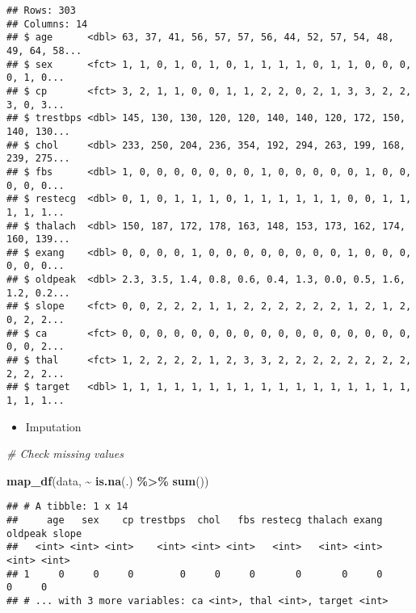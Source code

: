 \documentclass[
]{book}
\newenvironment{Shaded}{\begin{snugshade}}{\end{snugshade}}
\newcommand{\CommentTok}[1]{\textcolor[rgb]{0.56,0.35,0.01}{\textit{#1}}}
\newcommand{\KeywordTok}[1]{\textcolor[rgb]{0.13,0.29,0.53}{\textbf{#1}}}
\newcommand{\NormalTok}[1]{#1}
\newcommand{\OperatorTok}[1]{\textcolor[rgb]{0.81,0.36,0.00}{\textbf{#1}}}
\newcommand{\StringTok}[1]{\textcolor[rgb]{0.31,0.60,0.02}{#1}}
\providecommand{\tightlist}{%
  \setlength{\itemsep}{0pt}\setlength{\parskip}{0pt}}
\begin{document}
\begin{verbatim}
## Rows: 303
## Columns: 14
## $ age      <dbl> 63, 37, 41, 56, 57, 57, 56, 44, 52, 57, 54, 48, 49, 64, 58...
## $ sex      <fct> 1, 1, 0, 1, 0, 1, 0, 1, 1, 1, 1, 0, 1, 1, 0, 0, 0, 0, 1, 0...
## $ cp       <fct> 3, 2, 1, 1, 0, 0, 1, 1, 2, 2, 0, 2, 1, 3, 3, 2, 2, 3, 0, 3...
## $ trestbps <dbl> 145, 130, 130, 120, 120, 140, 140, 120, 172, 150, 140, 130...
## $ chol     <dbl> 233, 250, 204, 236, 354, 192, 294, 263, 199, 168, 239, 275...
## $ fbs      <dbl> 1, 0, 0, 0, 0, 0, 0, 0, 1, 0, 0, 0, 0, 0, 1, 0, 0, 0, 0, 0...
## $ restecg  <dbl> 0, 1, 0, 1, 1, 1, 0, 1, 1, 1, 1, 1, 1, 0, 0, 1, 1, 1, 1, 1...
## $ thalach  <dbl> 150, 187, 172, 178, 163, 148, 153, 173, 162, 174, 160, 139...
## $ exang    <dbl> 0, 0, 0, 0, 1, 0, 0, 0, 0, 0, 0, 0, 0, 1, 0, 0, 0, 0, 0, 0...
## $ oldpeak  <dbl> 2.3, 3.5, 1.4, 0.8, 0.6, 0.4, 1.3, 0.0, 0.5, 1.6, 1.2, 0.2...
## $ slope    <fct> 0, 0, 2, 2, 2, 1, 1, 2, 2, 2, 2, 2, 2, 1, 2, 1, 2, 0, 2, 2...
## $ ca       <fct> 0, 0, 0, 0, 0, 0, 0, 0, 0, 0, 0, 0, 0, 0, 0, 0, 0, 0, 0, 2...
## $ thal     <fct> 1, 2, 2, 2, 2, 1, 2, 3, 3, 2, 2, 2, 2, 2, 2, 2, 2, 2, 2, 2...
## $ target   <dbl> 1, 1, 1, 1, 1, 1, 1, 1, 1, 1, 1, 1, 1, 1, 1, 1, 1, 1, 1, 1...
\end{verbatim}

\begin{itemize}
\tightlist
\item
  Imputation
\end{itemize}

\begin{Shaded}
\begin{Highlighting}[]
\CommentTok{\# Check missing values }

\KeywordTok{map\_df}\NormalTok{(data, }\OperatorTok{\textasciitilde{}}\StringTok{ }\KeywordTok{is.na}\NormalTok{(.) }\OperatorTok{\%\textgreater{}\%}\StringTok{ }\KeywordTok{sum}\NormalTok{())}
\end{Highlighting}
\end{Shaded}

\begin{verbatim}
## # A tibble: 1 x 14
##     age   sex    cp trestbps  chol   fbs restecg thalach exang oldpeak slope
##   <int> <int> <int>    <int> <int> <int>   <int>   <int> <int>   <int> <int>
## 1     0     0     0        0     0     0       0       0     0       0     0
## # ... with 3 more variables: ca <int>, thal <int>, target <int>
\end{verbatim}
\end{document}
